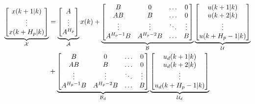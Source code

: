 \begin{equation}
\begin{aligned}
	  \underbrace{\begin{bmatrix}
	  x(k+1|k) \\
	  \vdots \\
	  x(k+H_p|k) \\
	   \end{bmatrix}}_{\CMcal{X}}
	 &=
	\underbrace{\begin{bmatrix}
		A \\
		\vdots \\
		A^{H_p} \\
	\end{bmatrix}}_{\CMcal{A}}
	x(k)+
	\underbrace{\begin{bmatrix}
		B 		 &0			&\hdots	& 0		\\
		AB  	 &B  		& \hdots& 0		\\
		\vdots 	 &\vdots	& \ddots&\vdots	\\
		A^{H_p-1}B&A^{H_p-2}B&\hdots &B 
    \end{bmatrix}}_{\CMcal{B}}
    	  \underbrace{\begin{bmatrix}
	  u(k+1|k) \\
	  u(k+2|k) \\
	  \vdots \\
	  u(k+H_p-1|k) \\
	   \end{bmatrix}}_{\CMcal{U}} \\ &+ 
    \underbrace{\begin{bmatrix}
    	B 		 &0			&\hdots	& 0		\\
		AB  	 &B  		& \hdots& 0		\\
		\vdots 	 &\vdots	& \ddots&\vdots	\\
		A^{H_p-1}B&A^{H_p-2}B&\hdots &B 
	  \end{bmatrix}}_{\CMcal{B}_d}
	    	  \underbrace{\begin{bmatrix}
	  u_d(k+1|k) \\
	  u_d(k+2|k) \\
	  \vdots \\
	  u_d(k+H_p-1|k) \\
	   \end{bmatrix}}_{\CMcal{U}_d} \\
	\end{aligned}
\end{equation}

